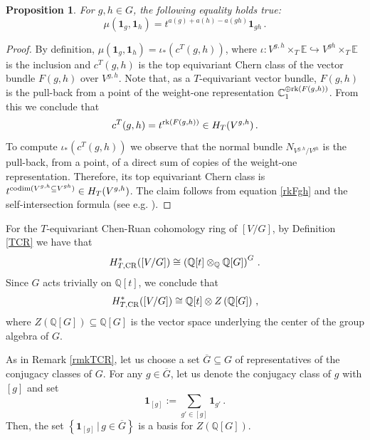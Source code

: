 \documentclass[a4paper,reqno]{amsart}
\theoremstyle{plain} %
\newtheorem{prop}[thm]{Proposition}
\theoremstyle{definition} %
\theoremstyle{remark} %
\newcommand{\E}{\mathbb{E}}
\newcommand{\Q}{\mathbb{Q}}
\newcommand{\C}{\mathbb{C}}
\newcommand{\fo}{\mathbf{1}}
\newcommand{\1}{\mathds{1}}   %
\begin{document}
\begin{prop}\label{musympl}
For $g, h \in G$, the following equality holds true:
$$
\mu (\fo_g, \fo_h) = t^{a(g)+a(h)-a(gh)} \fo_{gh} \, .
$$
\end{prop}
\begin{proof} 
By definition, $\mu (\fo_g, \fo_h) = \iota_* \left( c^T(g,h) \right)$, where 
$\iota \colon V^{g,h}\times_T \E \hookrightarrow V^{gh} \times_T \E$ is the inclusion and 
$c^T(g,h)$ is the top equivariant  Chern class of the vector bundle $F(g, h)$ over $V^{g,h}$.
Note that, as a $T$-equivariant vector bundle, $F(g, h)$ is the pull-back from a point of
the weight-one representation  $\C_1^{\oplus {\rm rk} (F(g,h))}$. From this we conclude that 
$$
c^T(g,h) = t^{{\rm rk} (F(g,h))} \in H_T(V^{g,h}) \, .
$$
To compute $\iota_* \left( c^T(g,h) \right)$ we observe that the normal bundle $N_{V^{g,h}/V^{gh}}$ is
the pull-back, from a point, of a direct sum of copies of the weight-one representation. 
Therefore, its top equivariant Chern class
is $t^{{\rm codim} (V^{g,h} \subseteq V^{gh})} \in H_T(V^{g,h})$. The claim follows from equation \eqref{rkFgh}
and the self-intersection formula (see e.g. \cite[Ch. 3]{AF}).
\end{proof}

For the $T$-equivariant Chen-Ruan cohomology ring of $[V/G]$, by Definition \ref{TCR} we have that
$$
H^*_{T, {\rm CR}}([V/G]) \cong \left( \Q[t] \otimes_\Q \Q[G] \right)^G \, .
$$ 
Since $G$ acts trivially on $\Q[t]$, we conclude that
\begin{equation}\label{TCRV/G}
H^*_{T, {\rm CR}}([V/G]) \cong \Q[t] \otimes Z\left( \Q[G]\right)  \, ,
\end{equation}
where $Z\left( \Q[G]\right)  \subseteq \Q[G]$ is the vector space underlying the center of the group algebra of $G$.

As in Remark \ref{rmkTCR}, let us choose a set $\overline{G} \subseteq G$ of representatives of the conjugacy classes of $G$.
For any $g\in \overline{G}$, let us denote the conjugacy class of $g$ with $[g]$ and set
$$
\fo_{[g]} := \sum_{g' \in [g]} \fo_{g'} \, .
$$
Then, the  set $\left\{ \fo_{[g]}   \, | \, g\in \overline{G} \right\}$ is a basis for $Z\left( \Q[G]\right)$.
\end{document}

